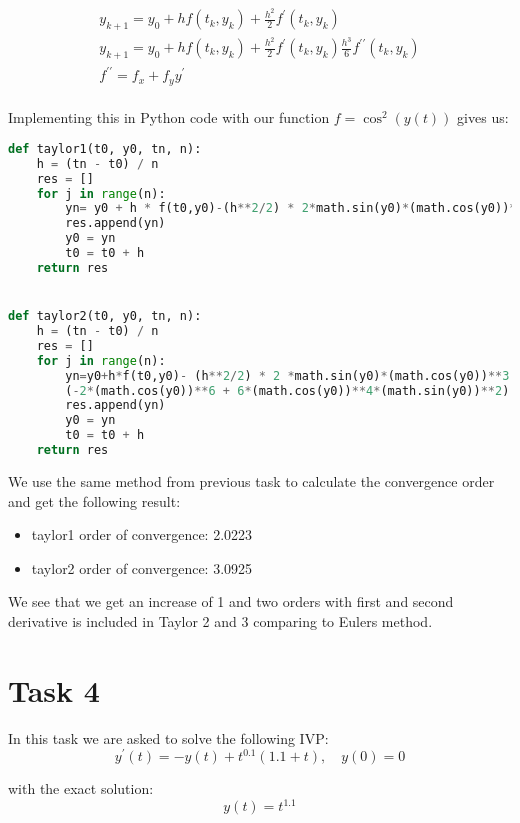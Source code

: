 \documentclass[a4paper]{article}
\begin{document}
\begin{equation}
\begin{aligned}
y_{k+1} = y_ 0 + hf(t_k,y_k)+ \frac{h^2} {2} f^{\prime}(t_k,y_k) \\
y_{k+1} = y_ 0 + hf(t_k,y_k) + \frac{h^2} {2}f^{\prime}(t_k,y_k) \frac{h^3} {6}f^{\prime\prime}(t_k,y_k) \\
f^{\prime\prime} = f_x +f_yy^\prime 
\end{aligned}
\end{equation}
 \\
Implementing this in Python code with our function $f = \cos^{2}(y(t))$ gives us:

\begin{lstlisting}[language=Python]
def taylor1(t0, y0, tn, n):
    h = (tn - t0) / n
    res = []
    for j in range(n):
        yn= y0 + h * f(t0,y0)-(h**2/2) * 2*math.sin(y0)*(math.cos(y0))**3
        res.append(yn)
        y0 = yn
        t0 = t0 + h
    return res


def taylor2(t0, y0, tn, n):
    h = (tn - t0) / n
    res = []
    for j in range(n):
        yn=y0+h*f(t0,y0)- (h**2/2) * 2 *math.sin(y0)*(math.cos(y0))**3 + (h**3/6) * 
        (-2*(math.cos(y0))**6 + 6*(math.cos(y0))**4*(math.sin(y0))**2)
        res.append(yn)
        y0 = yn
        t0 = t0 + h
    return res
\end{lstlisting}

We use the same method from previous task to calculate the convergence order and get the following result: 

\begin{itemize}
	\item taylor1 order of convergence:  2.0223
	\item taylor2 order of convergence:  3.0925
\end{itemize}

We see that we get an increase of 1 and  two orders with first and second derivative is included in Taylor 2 and 3 comparing to Eulers method. 

\section*{Task 4}
In this task we are asked to solve the following IVP: 
\begin{equation}
y^{\prime}(t) = -y(t)+t^{0.1}(1.1+t), \quad y(0)=0
\end{equation}

with the exact solution:
\begin{equation}
y(t) = t^{1.1}
\end{equation}
\end{document}
